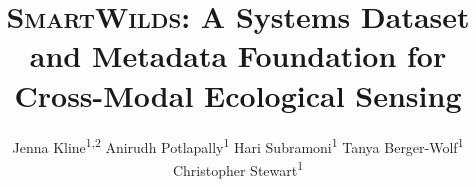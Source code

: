 \documentclass[sigconf]{acmart}
\newcommand{\smartwilds}{\textsc{SmartWilds}\xspace}
\begin{document}
\title{\smartwilds: A Systems Dataset and Metadata Foundation for
Cross-Modal Ecological Sensing}

%
%


\author{Jenna Kline\textsuperscript{1,2} \quad
        Anirudh Potlapally\textsuperscript{1} \quad
        Hari Subramoni\textsuperscript{1} \quad
        Tanya Berger-Wolf\textsuperscript{1} \quad
        Christopher Stewart\textsuperscript{1}}

\renewcommand{\shortauthors}{Kline et al.}
\end{document}

